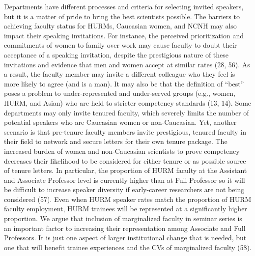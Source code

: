 \documentclass[10pt,]{article}
\begin{document}
Departments have different processes and criteria for selecting invited
speakers, but it is a matter of pride to bring the best scientists
possible. The barriers to achieving faculty status for HURMs, Caucasian
women, and NCNH may also impact their speaking invitations. For
instance, the perceived prioritization and commitments of women to
family over work may cause faculty to doubt their acceptance of a
speaking invitation, despite the prestigious nature of these invitations
and evidence that men and women accept at similar rates (28, 56). As a
result, the faculty member may invite a different colleague who they
feel is more likely to agree (and is a man). It may also be that the
definition of ``best'' poses a problem to under-represented and
under-served groups (e.g., women, HURM, and Asian) who are held to
stricter competency standards (13, 14). Some departments may only invite
tenured faculty, which severely limits the number of potential speakers
who are Caucasian women or non-Caucasian. Yet, another scenario is that
pre-tenure faculty members invite prestigious, tenured faculty in their
field to network and secure letters for their own tenure package. The
increased burden of women and non-Caucasian scientists to prove
competency decreases their likelihood to be considered for either tenure
or as possible source of tenure letters. In particular, the proportion
of HURM faculty at the Assistant and Associate Professor level is
currently higher than at Full Professor so it will be difficult to
increase speaker diversity if early-career researchers are not being
considered (57). Even when HURM speaker rates match the proportion of
HURM faculty employment, HURM trainees will be represented at a
significantly higher proportion. We argue that inclusion of marginalized
faculty in seminar series is an important factor to increasing their
representation among Associate and Full Professors. It is just one
aspect of larger institutional change that is needed, but one that will
benefit trainee experiences and the CVs of marginalized faculty (58).
\end{document}
